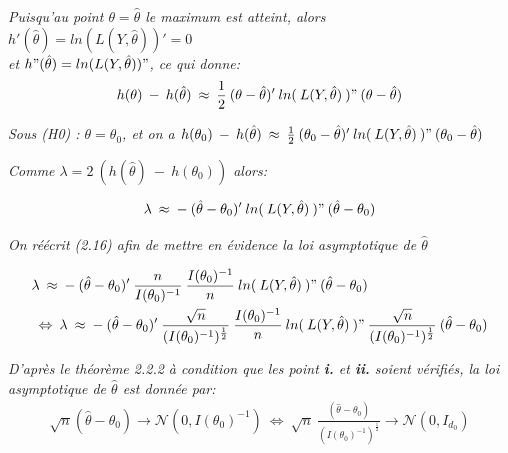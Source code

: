 \documentclass[11pt,fleqn]{book} %
\begin{document}
	\textit{Puisqu'au point $\theta=\hat{\theta}$ le maximum est atteint, alors $h'(\hat{\theta})=ln(L(Y,\hat{\theta}))'=0$\\ 
		et $h"(\hat{\theta})=ln(L(Y,\hat{\theta}))"$, ce qui donne:\\}
	\[ 
	h(\theta)\:-\:h(\hat{\theta})\:\approx\: \frac{1}{2} \:(\theta-\hat{\theta})'\:ln(\:L(Y,\hat{\theta})\:)"\:(\theta-\hat{\theta})
	\]
	
	\textit{Sous (H0) : $\theta=\theta_0$, et on a $h(\theta_0)\:-\:h(\hat{\theta})\:\approx\: \frac{1}{2}\:(\theta_0-\hat{\theta})'\:ln(\:L(Y,\hat{\theta})\:)"\:(\theta_0-\hat{\theta})$} 
	
	\vspace{1em}
	
	\textit{Comme $\lambda=2\:\left( h(\hat{\theta})\:-\:h(\theta_0)\right)$ alors:}
	
	\begin{equation}
		\lambda\:\approx\:-\:(\hat{\theta}-\theta_0)'\:ln(\:L(Y,\hat{\theta})\:)"\:(\hat{\theta}-\theta_0)
	\end{equation}
	
	\vspace{0.5em}
	
	\textit{On réécrit (2.16) afin de mettre en évidence la loi asymptotique de $\hat{\theta}$}
	
	\begin{align*}
		&\lambda\:\approx\:-\:(\hat{\theta}-\theta_0)'\:\frac{n}{I(\theta_0)^{-1}}\:\frac{I(\theta_0)^{-1}}{n}\:ln(\:L(Y,\hat{\theta})\:)"\:(\hat{\theta}-\theta_0)\\
		&\:\Leftrightarrow\: \lambda\:\approx\:-\:(\hat{\theta}-\theta_0)'\:\frac{\sqrt{n}}{(I(\theta_0)^{-1})^{\frac{1}{2}}}\:\frac{I(\theta_0)^{-1}}{n}\:ln(\:L(Y,\hat{\theta})\:)"\:\frac{\sqrt{n}}{(I(\theta_0)^{-1})^{\frac{1}{2}}}\:(\hat{\theta}-\theta_0)
	\end{align*}
	
	\vspace{0.5em}
	
	\textit{D'après le théorème 2.2.2 à condition que les point \textbf{i.} et \textbf{ii.} soient vérifiés, la loi asymptotique de $\hat{\theta}$ est donnée par:}
	\begin{align*}
		\sqrt{n}(\hat{\theta}-\theta_0)\rightarrow \mathcal{N}(0,I(\theta_0)^{-1}) \:\Leftrightarrow\: \sqrt{n}\:\frac{(\hat{\theta}-\theta_0)}{(I(\theta_0)^{-1})^{\frac{1}{2}}}\rightarrow \mathcal{N}(0,I_{d_0})
	\end{align*}
	
\end{document}
